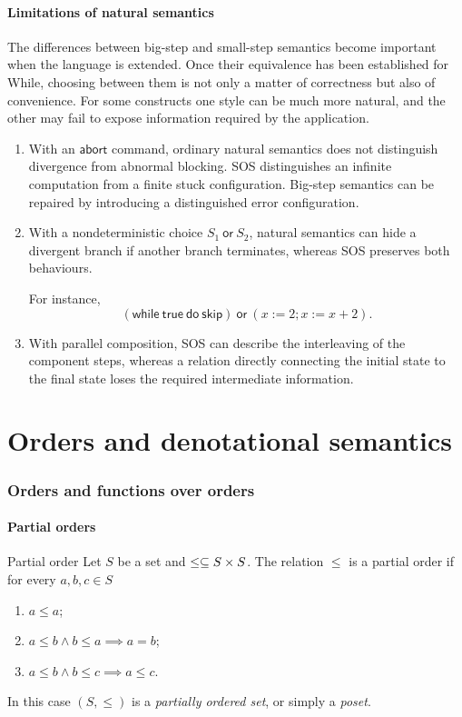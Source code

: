 \documentclass[a4paper]{article}
\newcommand{\skipc}{\mathsf{skip}}
\begin{document}
\subsection{Limitations of natural semantics}

The differences between big-step and small-step semantics become important when the language is extended.
Once their equivalence has been established for While, choosing between them is not only a matter of correctness but also of convenience.
For some constructs one style can be much more natural, and the other may fail to expose information required by the application.
\begin{enumerate}
    \item With an \(\mathsf{abort}\) command, ordinary natural semantics does not distinguish divergence from abnormal blocking. SOS distinguishes an infinite computation from a finite stuck configuration. Big-step semantics can be repaired by introducing a distinguished error configuration.
    \item With a nondeterministic choice \(S_1\ \mathsf{or}\ S_2\), natural semantics can hide a divergent branch if another branch terminates, whereas SOS preserves both behaviours.

    For instance,
    \[
        (\mathsf{while}\ \mathsf{true}\ \mathsf{do}\ \skipc)
        \ \mathsf{or}\
        (x:=2;x:=x+2).
    \]
    \item With parallel composition, SOS can describe the interleaving of the component steps, whereas a relation directly connecting the initial state to the final state loses the required intermediate information.
\end{enumerate}

\pagebreak
\part{Orders and denotational semantics}

\section{Orders and functions over orders}

\subsection{Partial orders}

\begin{snippetdefinition}{Partial order}
    Let \(S\) be a set and \(\leq\subseteq S\times S\).
    The relation \(\leq\) is a partial order if for every \(a,b,c\in S\)
    \begin{enumerate}
        \item \(a\leq a\);
        \item \(a\leq b\land b\leq a\implies a=b\);
        \item \(a\leq b\land b\leq c\implies a\leq c\).
    \end{enumerate}
    In this case \((S,\leq)\) is a \emph{partially ordered set}, or simply a \emph{poset}.
\end{snippetdefinition}
\end{document}
